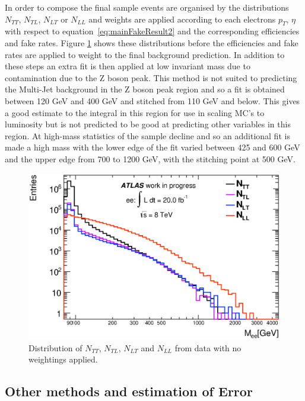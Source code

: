 In order to compose the final sample events are organised by the distributions $N_{TT}$, $N_{TL}$, $N_{LT}$ or $N_{LL}$ and weights are applied according to each electrons $p_{T}$, $\eta$ with respect to equation~\ref{eq:mainFakeResult2} and the corresponding efficiencies and fake rates. 
Figure \ref{fig:N_dist} shows these distributions before the efficiencies and fake rates are applied to weight to the final background prediction. In addition to these steps an extra fit is then applied at low invariant mass due to contamination due to the Z boson peak. This method is not suited to predicting the Multi-Jet background in the Z boson peak region and so a fit is obtained between 120 GeV and 400 GeV and stitched from 110 GeV and below. This gives a good estimate to the integral in this region for use in scaling MC's to luminosity but is not predicted to be good at predicting other variables in this region. At high-mass statistics of the sample decline and so an additional fit is made a high mass with the lower edge of the fit varied between 425 and 600 GeV and the upper edge from 700 to 1200 GeV, with the stitching point at 500 GeV.

   \begin{figure}[h]
      \begin{center}
      \includegraphics[width=0.98\linewidth]{images/N_distributions.eps}
      \end{center}
   \caption{Distribution of $N_{TT}$, $N_{TL}$, $N_{LT}$ and $N_{LL}$ from data with no weightings applied.}
   \label{fig:N_dist}
   \end{figure}






\subsection{Other methods and estimation of Error}
   \label{sec:MJerror}


